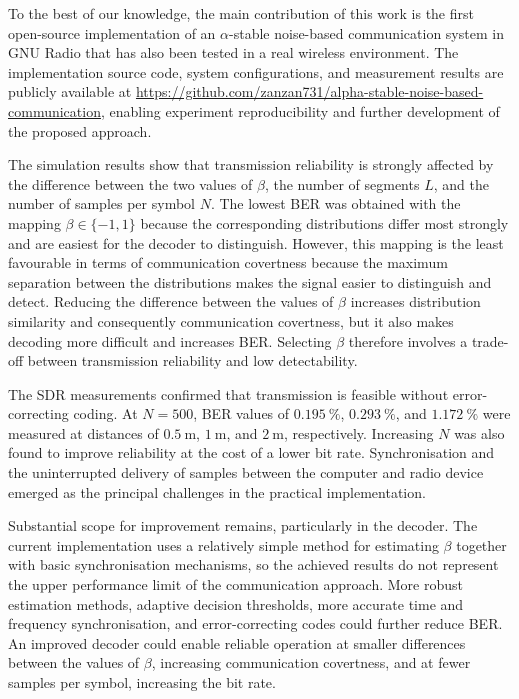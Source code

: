\documentclass[a4paper, 12pt, openany]{book}
\begin{document}
To the best of our knowledge, the main contribution of this work is the first open-source implementation of an $\alpha$-stable noise-based communication system in GNU Radio that has also been tested in a real wireless environment. The implementation source code, system configurations, and measurement results are publicly available at \url{https://github.com/zanzan731/alpha-stable-noise-based-communication}, enabling experiment reproducibility and further development of the proposed approach.

The simulation results show that transmission reliability is strongly affected by the difference between the two values of $\beta$, the number of segments $L$, and the number of samples per symbol $N$. The lowest BER was obtained with the mapping $\beta\in\{-1,1\}$ because the corresponding distributions differ most strongly and are easiest for the decoder to distinguish. However, this mapping is the least favourable in terms of communication covertness because the maximum separation between the distributions makes the signal easier to distinguish and detect. Reducing the difference between the values of $\beta$ increases distribution similarity and consequently communication covertness, but it also makes decoding more difficult and increases BER. Selecting $\beta$ therefore involves a trade-off between transmission reliability and low detectability.

The SDR measurements confirmed that transmission is feasible without error-correcting coding. At $N=500$, BER values of $0.195~\%$, $0.293~\%$, and $1.172~\%$ were measured at distances of $0.5~\mathrm{m}$, $1~\mathrm{m}$, and $2~\mathrm{m}$, respectively. Increasing $N$ was also found to improve reliability at the cost of a lower bit rate. Synchronisation and the uninterrupted delivery of samples between the computer and radio device emerged as the principal challenges in the practical implementation.

Substantial scope for improvement remains, particularly in the decoder. The current implementation uses a relatively simple method for estimating $\beta$ together with basic synchronisation mechanisms, so the achieved results do not represent the upper performance limit of the communication approach. More robust estimation methods, adaptive decision thresholds, more accurate time and frequency synchronisation, and error-correcting codes could further reduce BER. An improved decoder could enable reliable operation at smaller differences between the values of $\beta$, increasing communication covertness, and at fewer samples per symbol, increasing the bit rate.
\end{document}
